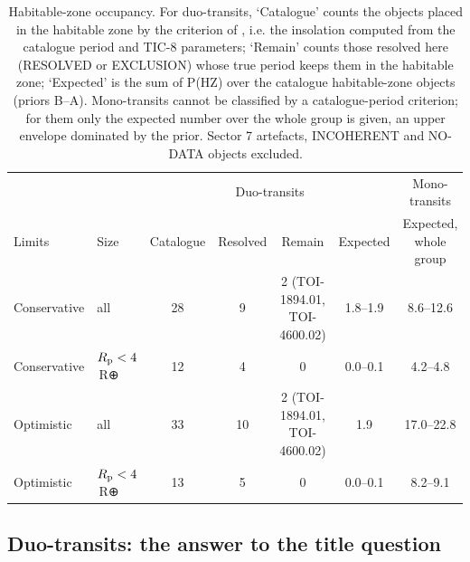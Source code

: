 \documentclass[fleqn,usenatbib]{mnras}
\newcommand{\Rp}{\ensuremath{R_{\rm p}}}
\begin{document}
\begin{table}
\centering
\caption{Habitable-zone occupancy. For duo-transits, `Catalogue' counts the objects placed in the habitable zone by the criterion of \citet{Kaltenegger2021}, i.e. the insolation computed from the catalogue period and TIC-8 parameters; `Remain' counts those resolved here (RESOLVED or EXCLUSION) whose true period keeps them in the habitable zone; `Expected' is the sum of P(HZ) over the catalogue habitable-zone objects (priors B--A). Mono-transits cannot be classified by a catalogue-period criterion; for them only the expected number over the whole group is given, an upper envelope dominated by the prior. Sector 7 artefacts, INCOHERENT and NO-DATA objects excluded.}
\label{tab:hz}
\begin{tabular}{llccccc}
\toprule
 & & \multicolumn{4}{c}{Duo-transits} & Mono-transits \\
Limits & Size & Catalogue & Resolved & Remain & Expected & Expected, whole group \\
\midrule
Conservative & all & 28 & 9 & 2 (TOI-1894.01, TOI-4600.02) & 1.8--1.9 & 8.6--12.6 \\
Conservative & $\Rp < 4$\,R⊕ & 12 & 4 & 0 & 0.0--0.1 & 4.2--4.8 \\
Optimistic & all & 33 & 10 & 2 (TOI-1894.01, TOI-4600.02) & 1.9 & 17.0--22.8 \\
Optimistic & $\Rp < 4$\,R⊕ & 13 & 5 & 0 & 0.0--0.1 & 8.2--9.1 \\
\bottomrule
\end{tabular}
\end{table}

\subsection{Duo-transits: the answer to the title question}
\end{document}
